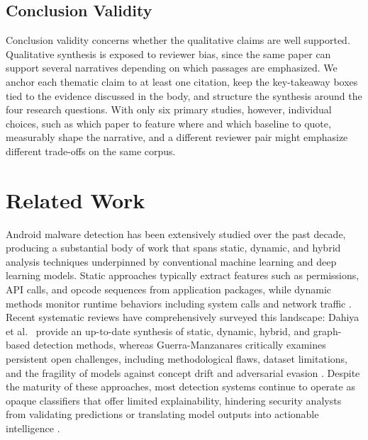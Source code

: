 \subsection{Conclusion Validity}
Conclusion validity concerns whether the qualitative claims are well supported. Qualitative synthesis is exposed to reviewer bias, since the same paper can support several narratives depending on which passages are emphasized. We anchor each thematic claim to at least one citation, keep the key-takeaway boxes tied to the evidence discussed in the body, and structure the synthesis around the four research questions. With only six primary studies, however, individual choices, such as which paper to feature where and which baseline to quote, measurably shape the narrative, and a different reviewer pair might emphasize different trade-offs on the same corpus.

\section{Related Work}\label{sec:relwork}

Android malware detection has been extensively studied over the past decade, producing a substantial body of work that spans static, dynamic, and hybrid analysis techniques underpinned by conventional machine learning and deep learning models. Static approaches typically extract features such as permissions, API calls, and opcode sequences from application packages, while dynamic methods monitor runtime behaviors including system calls and network traffic \cite{xu2019droidevolver, kim2019multimodal, cai2021jowmdroid}. Recent systematic reviews have comprehensively surveyed this landscape: Dahiya et al.\ \cite{dahiya2025} provide an up-to-date synthesis of static, dynamic, hybrid, and graph-based detection methods, whereas Guerra-Manzanares \cite{GuerraManzanares2024} critically examines persistent open challenges, including methodological flaws, dataset limitations, and the fragility of models against concept drift and adversarial evasion \cite{barbero2022transcending, pendlebury2019tesseract}. Despite the maturity of these approaches, most detection systems continue to operate as opaque classifiers that offer limited explainability, hindering security analysts from validating predictions or translating model outputs into actionable intelligence \cite{Li2024-wl}.

